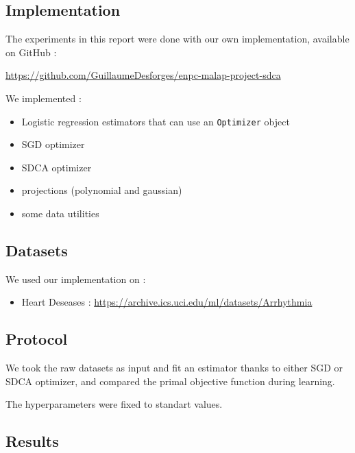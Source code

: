 \documentclass{article}
\begin{document}
\subsection{Implementation}

The experiments in this report were done with our own implementation, available on GitHub :

\url{ https://github.com/GuillaumeDesforges/enpc-malap-project-sdca }

We implemented :

\begin{itemize}
	\item Logistic regression estimators that can use an \texttt{Optimizer} object
	\item SGD optimizer
	\item SDCA optimizer
	\item projections (polynomial and gaussian)
	\item some data utilities
\end{itemize}

\subsection{Datasets}

We used our implementation on :

\begin{itemize}
	\item Heart Deseases : \url{https://archive.ics.uci.edu/ml/datasets/Arrhythmia}
\end{itemize}

\subsection{Protocol}

We took the raw datasets as input and fit an estimator thanks to either SGD or SDCA optimizer, and compared the primal objective function during learning.

The hyperparameters were fixed to standart values.

\subsection{Results}



\newpage
\end{document}
